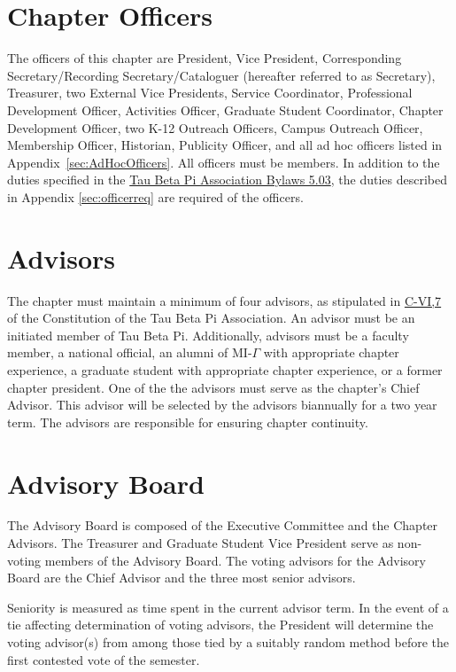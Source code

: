 \section{Chapter Officers} The officers of this chapter are  President, Vice President, Corresponding Secretary/Recording Secretary/Cataloguer 
(hereafter referred to as Secretary), Treasurer, two External Vice Presidents,
 Service Coordinator, Professional Development Officer, Activities Officer,  Graduate Student Coordinator, Chapter Development Officer, two K-12 Outreach
 Officers, Campus Outreach Officer, Membership Officer, 
Historian, Publicity Officer, and all ad hoc officers listed in Appendix~\ref{sec:AdHocOfficers}.  All officers must be  members. In addition to the duties specified in the \href{http://www.tbp.org/off/ConstBylaw.pdf}{Tau Beta Pi Association Bylaws 5.03}, the duties described in Appendix \ref{sec:officerreq} are required of the officers.

\section{Advisors}\label{sec:advisors} The chapter must maintain a minimum of four advisors, as stipulated in \href{http://www.tbp.org/off/ConstBylaw.pdf}{C-VI,7} of the Constitution of the Tau Beta Pi Association. An advisor must be an initiated member of Tau Beta Pi. Additionally, advisors must be a faculty member, %
a national official, %
an alumni of MI-$\Gamma$ with appropriate chapter experience, a graduate student with appropriate chapter experience, or a former chapter president. One of the the advisors must serve as the chapter's Chief Advisor. This advisor will be selected by the advisors biannually for a two year term. The advisors are responsible for ensuring chapter continuity.

\section{Advisory Board}\label{sec:advbrd} The Advisory Board is composed of the Executive Committee and the Chapter Advisors.  The Treasurer and Graduate Student Vice President serve as non-voting members of the Advisory Board. The voting advisors for the Advisory Board are the Chief Advisor and the three most senior advisors.
\begin{enumsubsection}
\itemnotoc Seniority is measured as time spent in the current advisor term.
\itemnotoc In the event of a tie affecting determination of voting advisors, the President will determine the voting advisor(s) from among those tied by a suitably random method before the first contested vote of the semester.
\end{enumsubsection}

